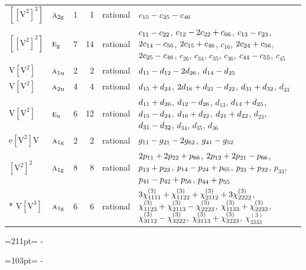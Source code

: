 \documentclass[10pt,a4paper]{article}
\newcommand{\needspace}[1]{\par\penalty-100\begingroup\dimen0=#1\relax\dimen2=\pagegoal
  \advance\dimen2-\pagetotal\ifdim\dimen0>\dimen2\relax\ifdim\dimen2>0pt\vfil\break\fi\fi
  \endgroup}
\numberwithin{equation}{section}
\newcommand{\irr}[1]{\text{\normalfont\scshape #1}}
\newcommand{\ptag}[1]{\mathrm{#1}}
\newcommand{\jahn}[1]{\mathrm{#1}}
\newlength{\fillwidth}\newlength{\cellwidth}\newlength{\colwidth}
\newcommand{\signbreak}{\penalty100\relax}
\begin{document}
{\begin{longtable}{@{}llrrl>{\RaggedRight\arraybackslash}p{\fillwidth}@{}}
$\jahn{[[V^{2}]^{2}]}$ & $\irr{a}_{2\ptag{g}}$ & 1 & 1 & rational & $c_{15} -\signbreak c_{25} -\signbreak c_{46}$\\
$\jahn{[[V^{2}]^{2}]}$ & $\irr{e}_{\ptag{g}}$ & 7 & 14 & rational & $c_{11} -\signbreak c_{22}$, $c_{12} -\signbreak 2c_{22} +\signbreak c_{66}$, $c_{13} -\signbreak c_{23}$, $2c_{14} -\signbreak c_{56}$, $2c_{15} +\signbreak c_{46}$, $c_{16}$, $2c_{24} +\signbreak c_{56}$, $2c_{25} -\signbreak c_{46}$, $c_{26}$, $c_{34}$, $c_{35}$, $c_{36}$, $c_{44} -\signbreak c_{55}$, $c_{45}$\\
$\jahn{V[V^{2}]}$ & $\irr{a}_{1\ptag{u}}$ & 2 & 2 & rational & $d_{11} -\signbreak d_{12} -\signbreak 2d_{26}$, $d_{14} -\signbreak d_{25}$\\
$\jahn{V[V^{2}]}$ & $\irr{a}_{2\ptag{u}}$ & 4 & 4 & rational & $d_{15} +\signbreak d_{24}$, $2d_{16} +\signbreak d_{21} -\signbreak d_{22}$, $d_{31} +\signbreak d_{32}$, $d_{33}$\\
$\jahn{V[V^{2}]}$ & $\irr{e}_{\ptag{u}}$ & 6 & 12 & rational & $d_{11} +\signbreak d_{26}$, $d_{12} -\signbreak d_{26}$, $d_{13}$, $d_{14} +\signbreak d_{25}$, $d_{15} -\signbreak d_{24}$, $d_{16} +\signbreak d_{22}$, $d_{21} +\signbreak d_{22}$, $d_{23}$, $d_{31} -\signbreak d_{32}$, $d_{34}$, $d_{35}$, $d_{36}$\\
$\jahn{e[V^{2}]V}$ & $\irr{a}_{1\ptag{g}}$ & 2 & 2 & rational & $\mathnormal{g}_{11} -\signbreak \mathnormal{g}_{21} -\signbreak 2\mathnormal{g}_{62}$, $\mathnormal{g}_{41} -\signbreak \mathnormal{g}_{52}$\\
$\jahn{[V^{2}]^{2}}$ & $\irr{a}_{1\ptag{g}}$ & 8 & 8 & rational & $2p_{11} +\signbreak 2p_{22} +\signbreak p_{66}$, $2p_{12} +\signbreak 2p_{21} -\signbreak p_{66}$, $p_{13} +\signbreak p_{23}$, $p_{14} -\signbreak p_{24} +\signbreak p_{65}$, $p_{31} +\signbreak p_{32}$, $p_{33}$, $p_{41} -\signbreak p_{42} +\signbreak p_{56}$, $p_{44} +\signbreak p_{55}$\\*
$\jahn{V[V^{3}]}$ & $\irr{a}_{1\ptag{g}}$ & 6 & 6 & rational & $3\chi^{(3)}_{1111} +\signbreak \chi^{(3)}_{1122} +\signbreak \chi^{(3)}_{2112} +\signbreak 3\chi^{(3)}_{2222}$, $\chi^{(3)}_{1123} +\signbreak \chi^{(3)}_{2113} -\signbreak \chi^{(3)}_{2223}$, $\chi^{(3)}_{1133} +\signbreak \chi^{(3)}_{2233}$, $\chi^{(3)}_{3112} -\signbreak \chi^{(3)}_{3222}$, $\chi^{(3)}_{3113} +\signbreak \chi^{(3)}_{3223}$, $\chi^{(3)}_{3333}$\\
\bottomrule\end{longtable}}
\needspace{211pt}
\needspace{103pt}
\end{document}
